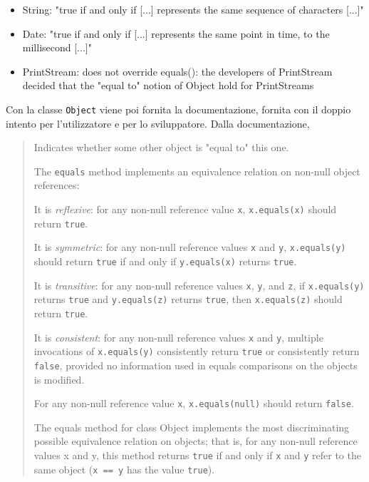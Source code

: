 \documentclass[\fontsizeclass,twocolumn]{\classname}
\theoremstyle{definition}
\theoremstyle{definition}
\begin{document}
\begin{itemize}
  \item String: "true if and only if [...] represents the same sequence of
  characters [...]"
  \item Date: "true if and only if [...] represents the same point in time, to the
  millisecond [...]"
  \item PrintStream: does not override equals(): the developers of PrintStream
  decided that the "equal to" notion of Object hold for PrintStreams
\end{itemize}

Con la classe \texttt{Object} viene poi fornita la documentazione, fornita con
il doppio intento per l'utilizzatore e per lo sviluppatore. Dalla documentazione,



\begin{quote}
\footnotesize{Indicates whether some other object is "equal to" this one.

The \texttt{equals} method implements an equivalence relation on non-null object
references:

It is \emph{reflexive}: for any non-null reference value \texttt{x},
\texttt{x.equals(x)} should return \texttt{true}.  

It is \emph{symmetric}: for any non-null reference values \texttt{x} and
\texttt{y}, \texttt{x.equals(y)} should return \texttt{true} if and only if
\texttt{y.equals(x)} returns \texttt{true}.  

It is \emph{transitive}: for any non-null reference values \texttt{x},
\texttt{y}, and \texttt{z}, if \texttt{x.equals(y)} returns \texttt{true} and
\texttt{y.equals(z)} returns \texttt{true}, then \texttt{x.equals(z)} should
return \texttt{true}.  

It is \emph{consistent}: for any non-null reference values \texttt{x} and
\texttt{y}, multiple invocations of \texttt{x.equals(y)} consistently return
\texttt{true} or consistently return \texttt{false}, provided no information
used in equals comparisons on the objects is modified.  

For any non-null reference value \texttt{x}, \texttt{x.equals(null)} should
return \texttt{false}.  

The equals method for class Object implements the most discriminating possible
equivalence relation on objects; that is, for any non-null reference values x
and y, this method returns \texttt{true} if and only if \texttt{x} and
\texttt{y} refer to the same object (\texttt{x == y} has the value
\texttt{true}).  }
\end{quote}
\end{document}
